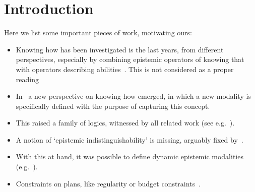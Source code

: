 \section{Introduction}
\label{sec:intro}

Here we list some important pieces of work, motivating ours:

\begin{itemize}
    \item Knowing how has been investigated is the last years, from different perspectives, especially by combining epistemic operators of knowing that with operators describing abilities~\cite{Mccarthy69,Moore85,Les00,Hoek00,HerzigT06}. This is not considered as a proper reading~\cite{JamrogaA07,Herzig15}
    \item In~\cite{Wang15lori,Wang16,Wang2016} a new perspective on knowing how emerged, in which a new modality is specifically defined with the purpose of capturing this concept.
    \item This raised a family of logics, witnessed by all related work (see e.g.~\cite{LiWang17,Li17,Li17bis,FervariHLW17,LiW21,NaumovT17,NaumovT18,NaumovT19,Naumov2018a}).
    \item A notion of `epistemic indistinguishability' is missing, arguably fixed by~\cite{AFSVQ21,AFSVQ23}.
    \item With this at hand, it was possible to define dynamic epistemic modalities (e.g.~\cite{AFSV22}).
    \item Constraints on plans, like regularity or budget constraints~\cite{DemriF23}.
\end{itemize}